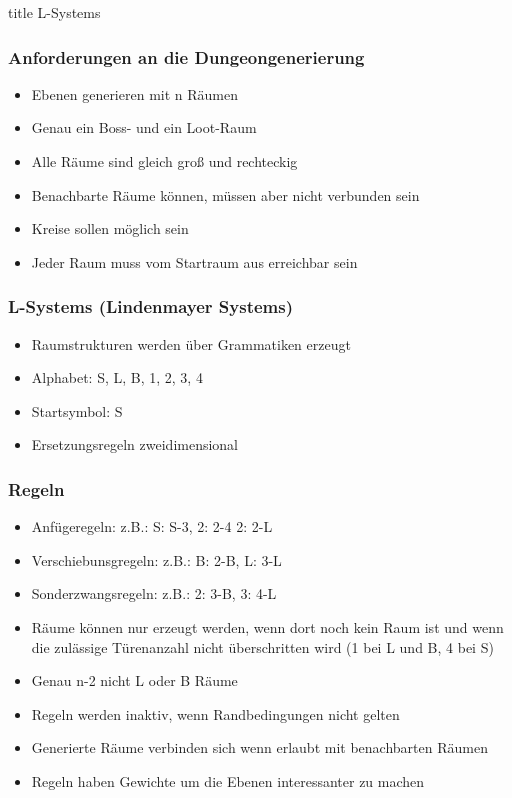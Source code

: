 \begin{frame}
\vfill
\centering
\begin{beamercolorbox}[sep=8pt,center,shadow=true,rounded=true]{title}
L-Systems
\end{beamercolorbox}
\vfill
\end{frame}

\begin{frame}
\frametitle{Anforderungen an die Dungeongenerierung}

\begin{itemize}
\item Ebenen generieren mit n Räumen
\item Genau ein Boss- und ein Loot-Raum
\item Alle Räume sind gleich groß und rechteckig
\item Benachbarte Räume können, müssen aber nicht verbunden sein
\item Kreise sollen möglich sein
\item Jeder Raum muss vom Startraum aus erreichbar sein
\end{itemize}

\end{frame}

\begin{frame}
\frametitle{L-Systems (Lindenmayer Systems)}

\begin{itemize}
\item Raumstrukturen werden über Grammatiken erzeugt
\item Alphabet: S, L, B, 1, 2, 3, 4
\item Startsymbol: S
\item Ersetzungsregeln zweidimensional
\end{itemize}

\end{frame}

\begin{frame}
\frametitle{Regeln}

\begin{itemize}
\item Anfügeregeln: z.B.: S: S-3, 2: 2-4 2: 2-L
\item Verschiebunsgregeln: z.B.: B: 2-B, L: 3-L
\item Sonderzwangsregeln: z.B.: 2: 3-B, 3: 4-L
\item Räume können nur erzeugt werden, wenn dort noch kein Raum ist und wenn die zulässige Türenanzahl nicht überschritten wird (1 bei L und B, 4 bei S)
\item Genau n-2 nicht L oder B Räume
\item Regeln werden inaktiv, wenn Randbedingungen nicht gelten
\item Generierte Räume verbinden sich wenn erlaubt mit benachbarten Räumen
\item Regeln haben Gewichte um die Ebenen interessanter zu machen
\end{itemize}

\end{frame}


